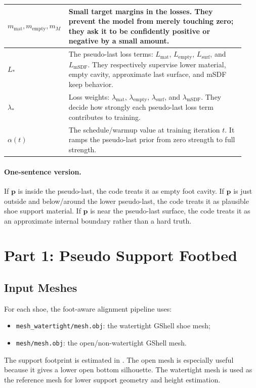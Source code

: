 \documentclass[11pt]{article}
\newcommand{\pt}{\mathbf{p}}
\begin{document}
\begin{longtable}{p{0.20\linewidth}p{0.73\linewidth}}
\midrule
\(m_{\mathrm{mat}},m_{\mathrm{empty}},m_M\) &
Small target margins in the losses.  They prevent the model from merely
touching zero; they ask it to be confidently positive or negative by a small
amount. \\
\midrule
\(L_*\) &
The pseudo-last loss terms: \(L_{\mathrm{mat}}\), \(L_{\mathrm{empty}}\),
\(L_{\mathrm{surf}}\), and \(L_{\mathrm{mSDF}}\).  They respectively supervise
lower material, empty cavity, approximate last surface, and mSDF keep behavior. \\
\midrule
\(\lambda_*\) &
Loss weights: \(\lambda_{\mathrm{mat}}\), \(\lambda_{\mathrm{empty}}\),
\(\lambda_{\mathrm{surf}}\), and \(\lambda_{\mathrm{mSDF}}\).  They decide how
strongly each pseudo-last loss term contributes to training. \\
\midrule
\(\alpha(t)\) &
The schedule/warmup value at training iteration \(t\).  It ramps the
pseudo-last prior from zero strength to full strength. \\
\bottomrule
\end{longtable}

\paragraph{One-sentence version.}
If \(\pt\) is inside the pseudo-last, the code treats it as empty foot cavity.
If \(\pt\) is just outside and below/around the lower pseudo-last, the code
treats it as plausible shoe support material.  If \(\pt\) is near the
pseudo-last surface, the code treats it as an approximate internal boundary
rather than a hard truth.

\section{Part 1: Pseudo Support Footbed}

\subsection{Input Meshes}

For each shoe, the foot-aware alignment pipeline uses:
\begin{itemize}
    \item \texttt{mesh\_watertight/mesh.obj}: the watertight GShell shoe mesh;
    \item \texttt{mesh/mesh.obj}: the open/non-watertight GShell mesh.
\end{itemize}

The support footprint is estimated in
.  The open mesh is
especially useful because it gives a lower open bottom silhouette.  The
watertight mesh is used as the reference mesh for lower support geometry and
height estimation.
\end{document}
